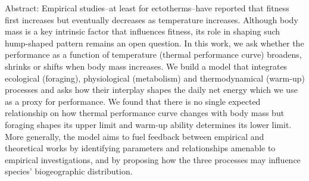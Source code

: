 \noindent
Abstract: Empirical studies--at least for ectotherms--have reported that fitness first increases but eventually decreases as temperature increases.
Although body mass is a key intrinsic factor that influences fitness, its role in shaping such hump-shaped pattern remains an open question.
In this work, we ask whether the performance as a function of temperature (thermal performance curve) broadens, shrinks or shifts when body mass increases.
We build a model that integrates ecological (foraging), physiological (metabolism) and thermodynamical (warm-up) processes and asks how their interplay shapes the daily net energy which we use as a proxy for performance.
We found that there is no single expected relationship on how thermal performance curve changes with body mass but foraging shapes its upper limit and warm-up ability determines its lower limit.
More generally, the model aims to fuel feedback between empirical and theoretical works by identifying parameters and relationships amenable to empirical investigations, and by proposing how the three processes may influence species' biogeographic distribution.
